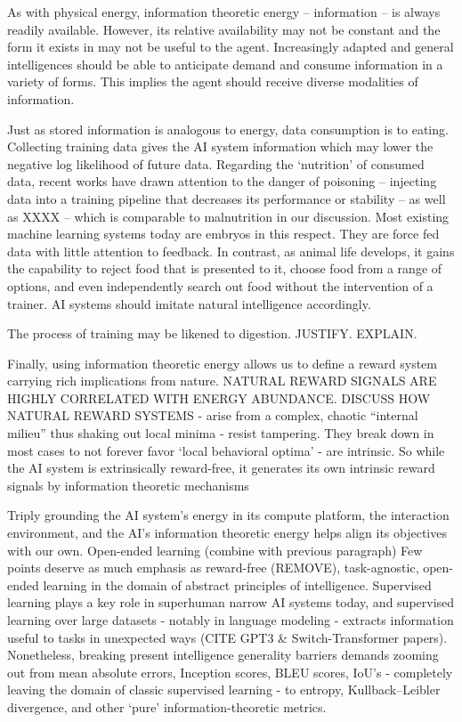 \documentclass{article}
\begin{document}
As with physical energy, information theoretic energy -- information -- is always readily available. However, its relative availability may not be constant and the form it exists in may not be useful to the agent. Increasingly adapted and general intelligences should be able to anticipate demand and consume information in a variety of forms. This implies the agent should receive diverse modalities of information.

Just as stored information is analogous to energy, data consumption is to eating. Collecting training data gives the AI system information which may lower the negative log likelihood of future data. Regarding the ‘nutrition’ of consumed data, recent works have drawn attention to the danger of poisoning -- injecting data into a training pipeline that decreases its performance or stability -- as well as XXXX -- which is comparable to malnutrition in our discussion. Most existing machine learning systems today are embryos in this respect. They are force fed data with little attention to feedback. In contrast, as animal life develops, it gains the capability to reject food that is presented to it, choose food from a range of options, and even independently search out food without the intervention of a trainer. AI systems should imitate natural intelligence accordingly.

The process of training may be likened to digestion. JUSTIFY. EXPLAIN.

Finally, using information theoretic energy allows us to define a reward system carrying rich implications from nature. NATURAL REWARD SIGNALS ARE HIGHLY CORRELATED WITH ENERGY ABUNDANCE. DISCUSS HOW NATURAL REWARD SYSTEMS
- arise from a complex, chaotic “internal milieu” thus shaking out local minima
- resist tampering. They break down in most cases to not forever favor ‘local behavioral optima’
- are intrinsic. So while the AI system is extrinsically reward-free, it generates its own intrinsic reward signals by information theoretic mechanisms

Triply grounding the AI system’s energy in its compute platform, the interaction environment, and the AI's information theoretic energy helps align its objectives with our own.
Open-ended learning (combine with previous paragraph)
Few points deserve as much emphasis as reward-free (REMOVE), task-agnostic, open-ended learning in the domain of abstract principles of intelligence. Supervised learning plays a key role in superhuman narrow AI systems today, and supervised learning over large datasets - notably in language modeling - extracts information useful to tasks in unexpected ways (CITE GPT3 \& Switch-Transformer papers). Nonetheless, breaking present intelligence generality barriers demands zooming out from mean absolute errors, Inception scores, BLEU scores, IoU’s - completely leaving the domain of classic supervised learning - to entropy, Kullback–Leibler divergence, and other ‘pure’ information-theoretic metrics.
\end{document}
